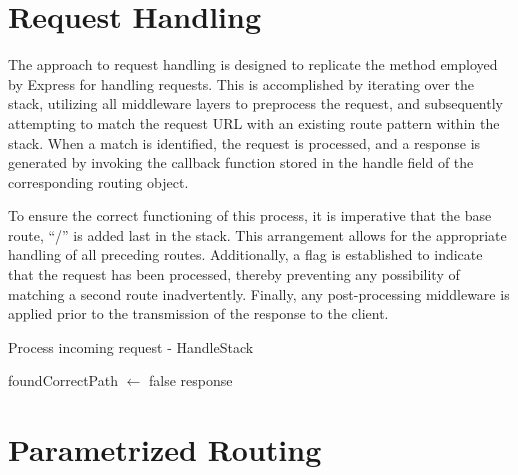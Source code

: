 \section{Request Handling}
\label{sec:req-handling}
The approach to request handling is designed to replicate the method employed by Express for handling requests. This is accomplished by iterating over the stack, utilizing all middleware layers to preprocess the request, and subsequently attempting to match the request URL with an existing route pattern within the stack. When a match is identified, the request is processed, and a response is generated by invoking the callback function stored in the handle field of the corresponding routing object.

To ensure the correct functioning of this process, it is imperative that the base route, “/” is added last in the stack. This arrangement allows for the appropriate handling of all preceding routes. Additionally, a flag is established to indicate that the request has been processed, thereby preventing any possibility of matching a second route inadvertently. Finally, any post-processing middleware is applied prior to the transmission of the response to the client.

\begin{algorithm}[t]
\caption{Process incoming request - HandleStack}
foundCorrectPath $\gets$ false\;
\Return response\;
\end{algorithm}


\section{Parametrized Routing}
\label{sec:param-route}

